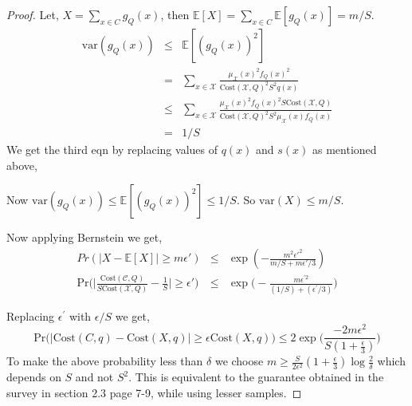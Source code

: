 \documentclass{article}
\begin{document}
\begin{proof}
Let, $X = \sum_{x \in C} g_{Q}(x)$, then $\mathbb{E}[X] = \sum_{x \in C} \mathbb{E}[g_{Q}(x)] = m/S$. 
\begin{eqnarray}
 \mbox{var}(g_{Q}(x)) &\leq& \mathbb{E}[(g_{Q}(x))^{2}] \nonumber \\
 &=& \sum_{x \in \mathcal{X}} \frac{\mu_{\mathcal{X}}(x)^{2}f_{Q}(x)^{2}}{\mbox{Cost}(\mathcal{X},Q)^{2}S^{2}q(x)} \nonumber \\
 &\leq& \sum_{x \in \mathcal{X}} \frac{\mu_{\mathcal{X}}(x)^{2}f_{Q}(x)^{2}S\mbox{Cost}(\mathcal{X},Q)}{\mbox{Cost}(\mathcal{X},Q)^{2}S^{2}\mu_{\mathcal{X}}(x)f_{Q}(x)} \nonumber \\
 &=& 1/S
\end{eqnarray}
We get the third eqn by replacing values of $q(x)$ and $s(x)$ as mentioned above,

Now $\mbox{var}(g_{Q}(x)) \leq \mathbb{E}[(g_{Q}(x))^{2}] \leq 1/S$. So $\mbox{var}(X)\leq m/S$. 

Now applying Bernstein we get,
\begin{eqnarray}
 Pr(| X-\mathbb{E}[X] | \geq m\epsilon') &\leq& \exp(-\frac{m^{2}\epsilon'^{2}}{m/S+m\epsilon'/3}) \nonumber \\
 \mbox{Pr}\bigg(\Big\vert\frac{\mbox{Cost}(\mathcal{C},Q)}{S\mbox{Cost}(\mathcal{X},Q)} - \frac{1}{S}\Big\vert \geq {\epsilon}'\bigg) &\leq& \exp\bigg(-\frac{m\epsilon^{'2}}{(1/S)+({\epsilon^{'}}/3)}\bigg)
\end{eqnarray}

Replacing $\epsilon^{'}$ with $\epsilon/S $ we get,
$$\mbox{Pr}\bigg(\Big\vert\mbox{Cost}(C,q)-\mbox{Cost}(X,q) \Big\vert \geq \epsilon\mbox{Cost}(X,q)\bigg) \leq 2\exp\bigg(\frac{-2m\epsilon^{2}}{S(1+\frac\epsilon 3)}\bigg)$$
To make the above probability less than $\delta$ we choose $m \geq \frac{S}{2\epsilon^2}(1+\frac\epsilon 3)\log\frac{2}{\delta}$ which depends on $S$ and not $S^2$. This is equivalent to the guarantee obtained in the survey \cite{bachem2017practical} in section 2.3 page 7-9, while using lesser samples.

\end{proof}
\end{document}
